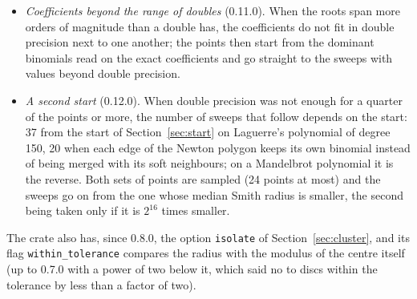 \documentclass[10pt,a4paper]{article}
\theoremstyle{definition}
\numberwithin{equation}{section}
\begin{document}
\begin{itemize}
 only when those bits are few against the bits of the evaluation (version 0.10.1: used for every point
 outside, it made a dense polynomial of degree 320 six times slower at 30 digits in versions 0.8.0 to
 0.10.0).
\item \emph{Coefficients beyond the range of doubles} (0.11.0). When the roots span more orders of
 magnitude than a double has, the coefficients do not fit in double precision next to one another; the
 points then start from the dominant binomials read on the exact coefficients and go straight to the
 sweeps with values beyond double precision.
\item \emph{A second start} (0.12.0). When double precision was not enough for a quarter of the points
 or more, the number of sweeps that follow depends on the start: 37 from the start of
 Section~\ref{sec:start} on Laguerre's polynomial of degree 150, 20 when each edge of the Newton polygon
 keeps its own binomial instead of being merged with its soft neighbours; on a Mandelbrot polynomial it
 is the reverse. Both sets of points are sampled (24 points at most) and the sweeps go on from the one
 whose median Smith radius is smaller, the second being taken only if it is $2^{16}$ times smaller.
\end{itemize}
The crate also has, since 0.8.0, the option \texttt{isolate} of Section~\ref{sec:cluster}, and its flag
\texttt{within\_tolerance} compares the radius with the modulus of the centre itself (up to 0.7.0 with a
power of two below it, which said no to discs within the tolerance by less than a factor of two).
\end{document}
